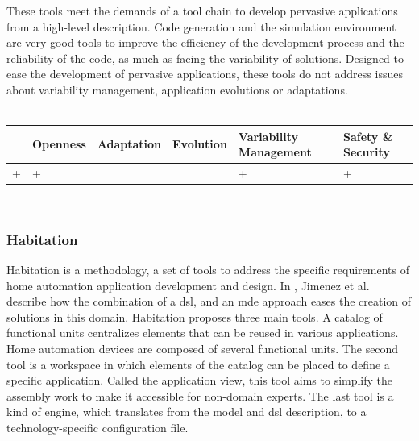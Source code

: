 These tools meet the demands of a tool chain to develop pervasive applications from a high-level description. Code generation and the simulation environment are very good tools to improve the efficiency of the development process and the reliability of the code, as much as facing the variability of solutions. Designed to ease the development of pervasive applications, these tools do not address issues about variability management, application evolutions or adaptations.\\
\\
\begin{tabular}{ >{\centering}m{}| >{\centering}m{} >{\centering}m{}| >{\centering}m{} >{\centering}m{}| >{\centering\arraybackslash}m{}}
{\tiny Interoperability} & {\tiny Openness} & {\tiny Adaptation} & {\tiny Evolution} & {\tiny Variability Management} & {\tiny Safety \& Security}\\
 \hline
 + & + &  &  & + & + \\ 
  \hline
\end{tabular}\\


\subsubsection{Habitation}
Habitation is a methodology, a set of tools to address the specific requirements of home automation application development and design. In \cite{Jimenez:2009}, Jimenez et al. describe how the combination of a \gls{dsl}, and an \gls{mde} approach eases the creation of solutions in this domain. Habitation proposes three main tools. A catalog of functional units centralizes elements that can be reused in various applications. Home automation devices are composed of several functional units. The second tool is a workspace in which elements of the catalog can be placed to define a specific application. Called the application view, this tool aims to simplify the assembly work to make it accessible for non-domain experts. The last tool is a kind of engine, which translates from the model and \gls{dsl} description, to a technology-specific configuration file.\\

